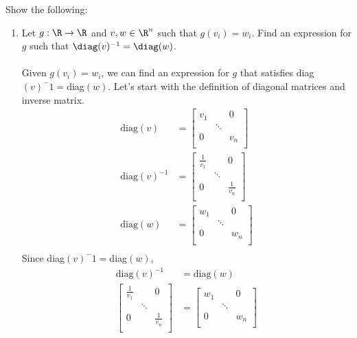 \documentclass{article}
\begin{document}
\newpage
\begin{aprob}\label{prob:matrixtype}
    Show the following:
    \begin{enumerate}
        \item {} Let $g : \R \rightarrow \R$ and $v, w \in \R^n$ such that $g(v_i) = w_i$. Find an expression for $g$ such that $\diag(v)^{-1} = \diag(w)$.
        \\ \\
        Given $g(v_i)= w_i$, we can find an expression for $g$ that satisfies diag$(v)^-1 = $diag$(w)$.
        Let's start with the definition of diagonal matrices and inverse matrix.
        \begin{align*}
            \text{diag}(v) &=
            \begin{bmatrix}
                v_1 & & 0 \\ & \ddots & \\ 0 & & v_n \\
            \end{bmatrix} \\
            \text{diag}(v)^{-1} &=
            \begin{bmatrix}
                \frac{1}{v_1} & & 0 \\ & \ddots & \\ 0 & & \frac{1}{v_n} \\
            \end{bmatrix} \\
            \text{diag}(w) &=
            \begin{bmatrix}
                w_1 & & 0 \\ & \ddots & \\ 0 & & w_n \\
            \end{bmatrix} \\
        \end{align*}
        Since diag$(v)^-1 = $diag$(w)$,
        \begin{align*}
            \text{diag}(v)^{-1} &= \text{diag}(w) \\
            \begin{bmatrix}
                \frac{1}{v_1} & & 0 \\ & \ddots & \\ 0 & & \frac{1}{v_n} \\
            \end{bmatrix} &=
            \begin{bmatrix}
                w_1 & & 0 \\ & \ddots & \\ 0 & & w_n \\

\end{bmatrix}
\end{align*}
\end{enumerate}
\end{aprob}
\end{document}
